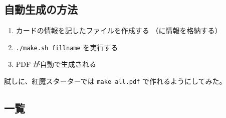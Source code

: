 \documentclass[line_length=22zw,number_of_lines=45,twocolumn]{jlreq}
\begin{document}
\subsection{自動生成の方法}
\begin{enumerate}
	\item カードの情報を記したファイルを作成する
		（に情報を格納する）
	\item \texttt{./make.sh fillname} を実行する
	\item PDF が自動で生成される
\end{enumerate}

試しに、紅魔スターターでは \texttt{make all.pdf} で作れるようにしてみた。

\subsection{一覧}
\end{document}
